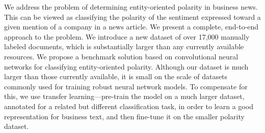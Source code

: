 We address the problem of determining entity-oriented polarity in business news.  This can be viewed as classifying the polarity of the sentiment expressed toward a given mention of a company in a news article.  We present a complete, end-to-end approach to the problem.  We introduce a new dataset of over 17,000 manually labeled documents, which is substantially larger than any currently available resources.  We propose a benchmark solution based on convolutional neural networks for classifying entity-oriented polarity.  Although our dataset is much larger than those currently available, it is small on the scale of datasets commonly used for training robust neural network models.  To compensate for this, we use transfer learning---pre-train the model on a much larger dataset, annotated for a related but different classification task, in order to learn a good representation for business text, and then fine-tune it on the smaller polarity dataset.
